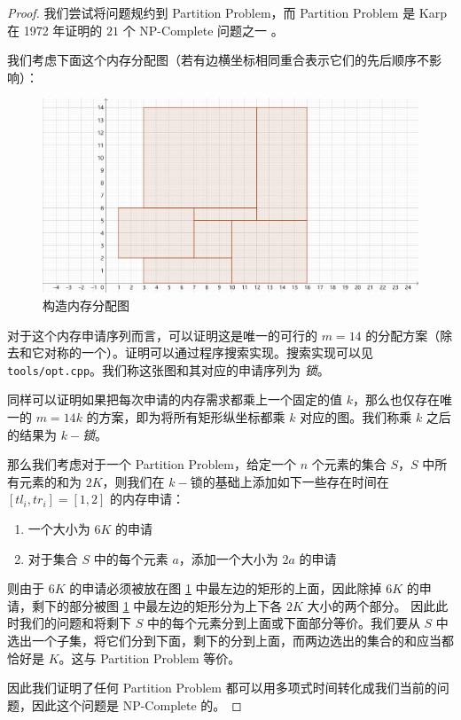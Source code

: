 \documentclass{noiassignment}
\begin{document}
	\begin{proof}
		我们尝试将问题规约到 Partition Problem，而 Partition Problem 是 Karp 在 1972 年证明的 $21$ 个 NP-Complete 问题之一 \cite{karp1972reducibility}。

		我们考虑下面这个内存分配图（若有边横坐标相同重合表示它们的先后顺序不影响）：
		\begin{figure}[htbp]
			\centering
			\includegraphics[scale=0.4]{assets/2}
			\caption{构造内存分配图}
			\label{mm_graph_lock}
		\end{figure}

		对于这个内存申请序列而言，可以证明这是唯一的可行的 $m=14$ 的分配方案（除去和它对称的一个）。证明可以通过程序搜索实现。搜索实现可以见 \texttt{tools/opt.cpp}。我们称这张图和其对应的申请序列为 \emph{锁}。
		
		同样可以证明如果把每次申请的内存需求都乘上一个固定的值 $k$，那么也仅存在唯一的 $m=14k$ 的方案，即为将所有矩形纵坐标都乘 $k$ 对应的图。我们称乘 $k$ 之后的结果为 \emph{$k-$锁}。

		那么我们考虑对于一个 Partition Problem，给定一个 $n$ 个元素的集合 $S$，$S$ 中所有元素的和为 $2K$，则我们在 $k-$锁的基础上添加如下一些存在时间在 $[tl_i, tr_i] = [1,2]$ 的内存申请：
		\begin{enumerate}
			\item 一个大小为 $6K$ 的申请
			\item 对于集合 $S$ 中的每个元素 $a$，添加一个大小为 $2a$ 的申请
		\end{enumerate}

		则由于 $6K$ 的申请必须被放在图 \ref{mm_graph_lock} 中最左边的矩形的上面，因此除掉 $6K$ 的申请，剩下的部分被图 \ref{mm_graph_lock} 中最左边的矩形分为上下各 $2K$ 大小的两个部分。
		因此此时我们的问题和将剩下 $S$ 中的每个元素分到上面或下面部分等价。我们要从 $S$ 中选出一个子集，将它们分到下面，剩下的分到上面，而两边选出的集合的和应当都恰好是 $K$。这与 Partition Problem 等价。

		因此我们证明了任何 Partition Problem 都可以用多项式时间转化成我们当前的问题，因此这个问题是 NP-Complete 的。

	\end{proof}

	\newpage

	
	
\end{document}
